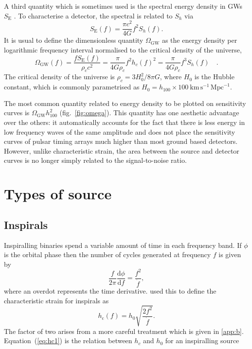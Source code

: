 \documentclass[fleqn,12pt]{iopart}
\newcommand{\dd}{\ensuremath{\mathrm{d}}}
\newcommand{\sub}[1]{\ensuremath{_\mathrm{#1}}}
\begin{document}
A third quantity which is sometimes used is the spectral energy density in GWs $S\sub{E}$ . To characterise a detector, the spectral is related to $S_{h}$ via \citep{HellingsDowns}
\begin{equation}\label{eq:spectralenergydensity}
S_{\textrm{E}}(f)=\frac{\pi c^{2}}{4G} f^{2}S_{h}(f).
\end{equation}
It is usual to define the dimensionless quantity $\Omega_{\textrm{GW}}$ as the energy density per logarithmic frequency interval normalised to the critical density of the universe,
\begin{equation}\label{eq:omega} 
\Omega_{\textrm{GW}}(f)=\frac{fS_{\textrm{E}}(f)}{\rho_{c}c^{2}}=\frac{\pi}{4G\rho_{c}}f^{2}h_{c}(f)^{2}=\frac{\pi}{4G\rho_{c}}f^{3}S_{h}(f)  \quad .
\end{equation}
The critical density of the universe is $\rho_{c} = 3H_0^{2}/{8\pi G}$, where $H_0$ is the Hubble constant, which is commonly parametrised as $H_0 = h_{100}\times 100~\textrm{km}\,\textrm{s}^{-1}\,\textrm{Mpc}^{-1}$.

The most common quantity related to energy density to be plotted on sensitivity curves is $\Omega_{\textrm{GW}}h_{100}^{2}$ (fig.~\ref{fig:omega}). This quantity has one aesthetic advantage over the others: it automatically accounts for the fact that there is less energy in low frequency waves of the same amplitude and does not place the sensitivity curves of pulsar timing arrays much higher than most ground based detectors. However, unlike characteristic strain, the area between the source and detector curves is no longer simply related to the signal-to-noise ratio.

\section{Types of source}\label{sec:voc}

\subsection{Inspirals}\label{sec:insp}

Inspiralling binaries spend a variable amount of time in each frequency band. If $\phi$ is the orbital phase then the number of cycles generated at frequency $f$ is given by
\begin{equation}\label{eq:inspiral}
\frac{f}{2\pi}\frac{\dd\phi}{\dd f} = \frac{f^{2}}{\dot{f}},
\end{equation}
where an overdot represents the time derivative. \citet{FinnThorne} used this to define the characteristic strain for inspirals as
\begin{equation}\label{eq:hc1}
h\sub{c}(f) = h_{0}\sqrt{\frac{2f^{2}}{\dot{f}}}.\end{equation}
The factor of two arises from a more careful treatment which is given in \ref{app:b}.
Equation~(\ref{eq:hc1}) is the relation between $h_{c}$ and $h_{0}$ for an inspiralling source  
\end{document}

